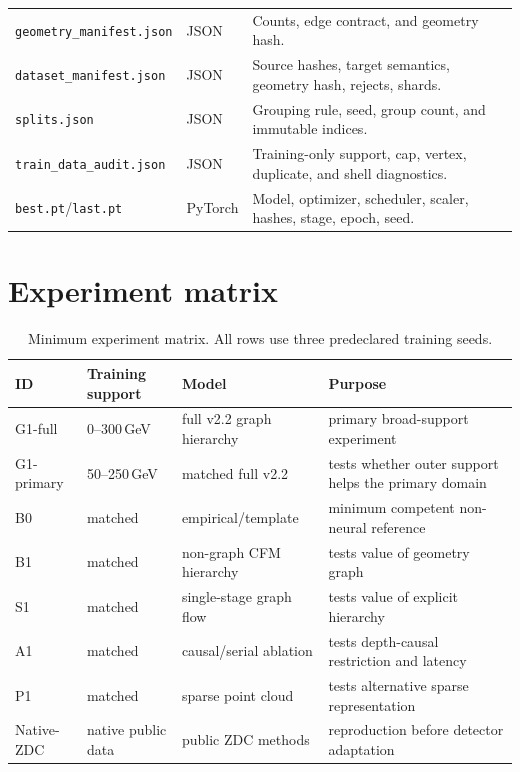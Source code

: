 \documentclass[10pt,a4paper]{article}
\begin{document}
\begin{longtable}{@{}p{}p{}p{}@{}}
\texttt{geometry\_manifest.json} & JSON & Counts, edge contract, and geometry hash. \\
\texttt{dataset\_manifest.json} & JSON & Source hashes, target semantics, geometry hash, rejects, shards. \\
\texttt{splits.json} & JSON & Grouping rule, seed, group count, and immutable indices. \\
\texttt{train\_data\_audit.json} & JSON & Training-only support, cap, vertex, duplicate, and shell diagnostics. \\
\texttt{best.pt}/\texttt{last.pt} & PyTorch & Model, optimizer, scheduler, scaler, hashes, stage, epoch, seed. \\
\bottomrule
\end{longtable}

\section{Experiment matrix}

\begin{table}[ht]
\centering
\caption{Minimum experiment matrix. All rows use three predeclared training seeds.}
\begin{tabularx}{\textwidth}{@{}p{}p{}p{}Y@{}}
\toprule
ID & Training support & Model & Purpose \\
\midrule
G1-full & 0--300\,GeV & full v2.2 graph hierarchy & primary broad-support experiment \\
G1-primary & 50--250\,GeV & matched full v2.2 & tests whether outer support helps the primary domain \\
B0 & matched & empirical/template & minimum competent non-neural reference \\
B1 & matched & non-graph CFM hierarchy & tests value of geometry graph \\
S1 & matched & single-stage graph flow & tests value of explicit hierarchy \\
A1 & matched & causal/serial ablation & tests depth-causal restriction and latency \\
P1 & matched & sparse point cloud & tests alternative sparse representation \\
Native-ZDC & native public data & public ZDC methods & reproduction before detector adaptation \\
\bottomrule
\end{tabularx}
\end{table}
\end{document}
